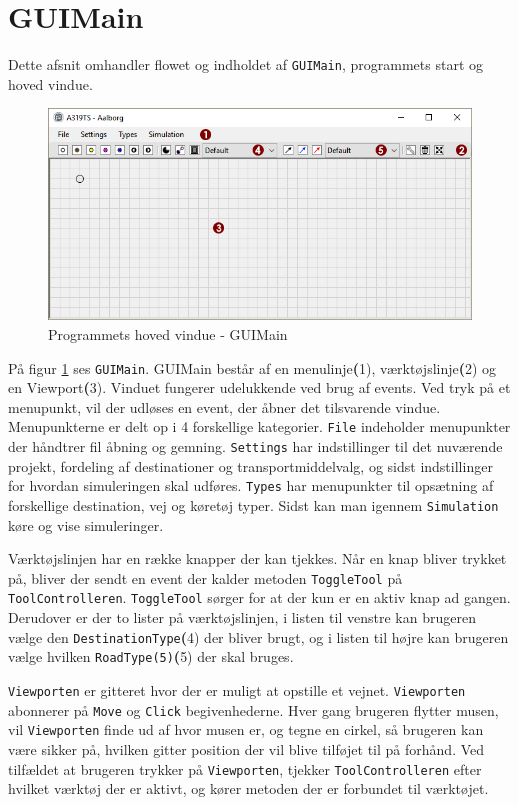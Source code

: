 \section{GUIMain}\label{HovedBrugerfladen}
Dette afsnit omhandler flowet og indholdet af \texttt{GUIMain}, programmets start og hoved vindue. 

\begin{figure}[!h]
    \centering
    \includegraphics[width=\textwidth,height=\textheight,keepaspectratio]{Pictures/Implementation/program2}
    \caption{Programmets hoved vindue - GUIMain}
    \label{a319program}
\end{figure}

På figur \ref{a319program} ses \texttt{GUIMain}. GUIMain består af en menulinje\textbf(1), værktøjslinje\textbf(2) og en Viewport\textbf(3). Vinduet fungerer udelukkende ved brug af events. Ved tryk på et menupunkt, vil der udløses en event, der åbner det tilsvarende vindue. Menupunkterne er delt op i 4 forskellige kategorier. \texttt{File} indeholder menupunkter der håndtrer fil åbning og gemning. \texttt{Settings} har indstillinger til det nuværende projekt, fordeling af destinationer og transportmiddelvalg, og sidst indstillinger for hvordan simuleringen skal udføres. \texttt{Types} har menupunkter til opsætning af forskellige destination, vej og køretøj typer. Sidst kan man igennem \texttt{Simulation} køre og vise simuleringer.

\vspace{5mm}

Værktøjslinjen har en række knapper der kan tjekkes. Når en knap bliver trykket på, bliver der sendt en event der kalder metoden \texttt{ToggleTool} på \texttt{ToolControlleren}. \texttt{ToggleTool} sørger for at der kun er en aktiv knap ad gangen. Derudover er der to lister på værktøjslinjen, i listen til venstre kan brugeren vælge den \texttt{DestinationType}\textbf(4) der bliver brugt, og i listen til højre kan brugeren vælge hvilken \texttt{RoadType(5)}\textbf(5) der skal bruges.

\vspace{5mm}

\texttt{Viewporten} er gitteret hvor der er muligt at opstille et vejnet. \texttt{Viewporten} abonnerer på \texttt{Move} og \texttt{Click} begivenhederne. Hver gang brugeren flytter musen, vil \texttt{Viewporten} finde ud af hvor musen er, og tegne en cirkel, så brugeren kan være sikker på, hvilken gitter position der vil blive tilføjet til på forhånd. Ved tilfældet at brugeren trykker på \texttt{Viewporten}, tjekker \texttt{ToolControlleren} efter hvilket værktøj der er aktivt, og kører metoden der er forbundet til værktøjet.